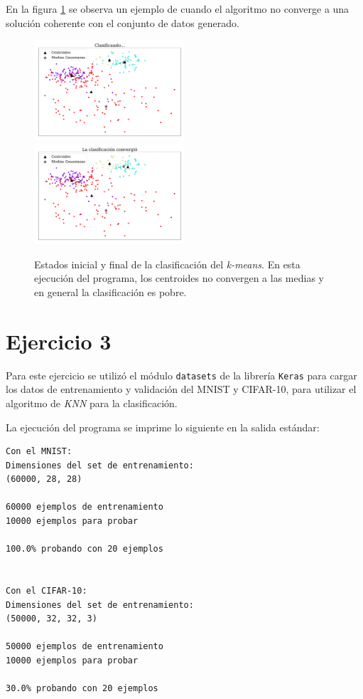     En la figura \ref{fig:ejer2_no_converge} se observa un ejemplo de cuando el algoritmo no converge a una solución coherente con el conjunto de datos generado. %

    \begin{figure}[H]
        \centering
        \includegraphics[width=0.5\textwidth]{plots/ejer_2_clasificando.pdf}
        \includegraphics[width=0.5\textwidth]{plots/ejer_2_no_converge.pdf}
        \caption{Estados inicial y final de la clasificación  del \emph{k-means}. En esta ejecución del programa, los centroides no convergen a las medias y en general la clasificación  es pobre.}
        \label{fig:ejer2_no_converge}
    \end{figure}

   \section*{Ejercicio 3}

   Para este ejercicio se utilizó el módulo \verb|datasets| de la librería \verb|Keras| para cargar los datos de entrenamiento y validación del MNIST y CIFAR-10, para utilizar el algoritmo de \emph{KNN} para la clasificación.

   La ejecución del programa se imprime lo siguiente  en la salida estándar:

   \begin{verbatim}
Con el MNIST: 
Dimensiones del set de entrenamiento:  
(60000, 28, 28)

60000 ejemplos de entrenamiento
10000 ejemplos para probar

100.0% probando con 20 ejemplos


Con el CIFAR-10: 
Dimensiones del set de entrenamiento:
(50000, 32, 32, 3)

50000 ejemplos de entrenamiento
10000 ejemplos para probar

30.0% probando con 20 ejemplos
   \end{verbatim}


